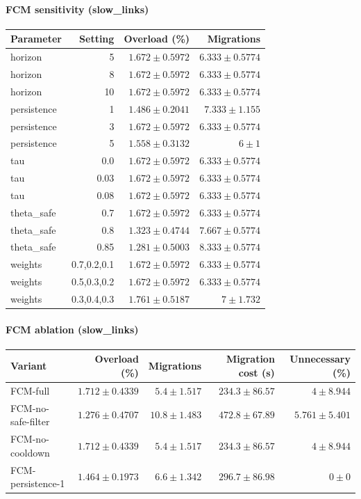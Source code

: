 \paragraph{FCM sensitivity (slow_links)}
\begin{tabular}{lrrr}
\hline
Parameter & Setting & Overload (\%) & Migrations \\
\hline
horizon & 5 & $1.672 \pm 0.5972$ & $6.333 \pm 0.5774$ \\
horizon & 8 & $1.672 \pm 0.5972$ & $6.333 \pm 0.5774$ \\
horizon & 10 & $1.672 \pm 0.5972$ & $6.333 \pm 0.5774$ \\
persistence & 1 & $1.486 \pm 0.2041$ & $7.333 \pm 1.155$ \\
persistence & 3 & $1.672 \pm 0.5972$ & $6.333 \pm 0.5774$ \\
persistence & 5 & $1.558 \pm 0.3132$ & $6 \pm 1$ \\
tau & 0.0 & $1.672 \pm 0.5972$ & $6.333 \pm 0.5774$ \\
tau & 0.03 & $1.672 \pm 0.5972$ & $6.333 \pm 0.5774$ \\
tau & 0.08 & $1.672 \pm 0.5972$ & $6.333 \pm 0.5774$ \\
theta_safe & 0.7 & $1.672 \pm 0.5972$ & $6.333 \pm 0.5774$ \\
theta_safe & 0.8 & $1.323 \pm 0.4744$ & $7.667 \pm 0.5774$ \\
theta_safe & 0.85 & $1.281 \pm 0.5003$ & $8.333 \pm 0.5774$ \\
weights & 0.7,0.2,0.1 & $1.672 \pm 0.5972$ & $6.333 \pm 0.5774$ \\
weights & 0.5,0.3,0.2 & $1.672 \pm 0.5972$ & $6.333 \pm 0.5774$ \\
weights & 0.3,0.4,0.3 & $1.761 \pm 0.5187$ & $7 \pm 1.732$ \\
\hline
\end{tabular}


\paragraph{FCM ablation (slow_links)}
\begin{tabular}{lrrrr}
\hline
Variant & Overload (\%) & Migrations & Migration cost (s) & Unnecessary (\%) \\
\hline
FCM-full & $1.712 \pm 0.4339$ & $5.4 \pm 1.517$ & $234.3 \pm 86.57$ & $4 \pm 8.944$ \\
FCM-no-safe-filter & $1.276 \pm 0.4707$ & $10.8 \pm 1.483$ & $472.8 \pm 67.89$ & $5.761 \pm 5.401$ \\
FCM-no-cooldown & $1.712 \pm 0.4339$ & $5.4 \pm 1.517$ & $234.3 \pm 86.57$ & $4 \pm 8.944$ \\
FCM-persistence-1 & $1.464 \pm 0.1973$ & $6.6 \pm 1.342$ & $296.7 \pm 86.98$ & $0 \pm 0$ \\
\hline
\end{tabular}
